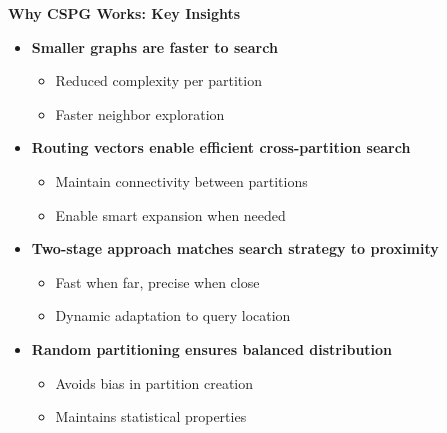 \begin{frame}
\textbf{Why CSPG Works: Key Insights}

\begin{itemize}
\item \textbf{Smaller graphs are faster to search}
\begin{itemize}
\item Reduced complexity per partition
\item Faster neighbor exploration
\end{itemize}

\item \textbf{Routing vectors enable efficient cross-partition search}
\begin{itemize}
\item Maintain connectivity between partitions
\item Enable smart expansion when needed
\end{itemize}

\item \textbf{Two-stage approach matches search strategy to proximity}
\begin{itemize}
\item Fast when far, precise when close
\item Dynamic adaptation to query location
\end{itemize}

\item \textbf{Random partitioning ensures balanced distribution}
\begin{itemize}
\item Avoids bias in partition creation
\item Maintains statistical properties
\end{itemize}
\end{itemize}
\end{frame}%

